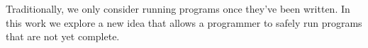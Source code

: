 Traditionally, we only consider running programs once they've been
 written. In this work we explore a new idea that allows a programmer to
safely run programs that are not yet complete.
